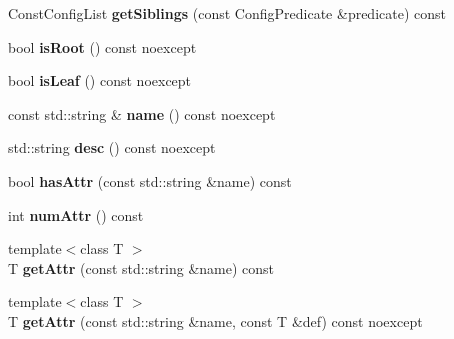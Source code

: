 \begin{DoxyCompactItemize}
\item 
\mbox{\label{classtheoria_1_1config_1_1Config_abb60532c082c92c628ae49ed3b2e9457}} 
Const\+Config\+List {\bfseries get\+Siblings} (const Config\+Predicate \&predicate) const
\item 
\mbox{\label{classtheoria_1_1config_1_1Config_ad50b474daddfbec84d7e610f7687fb04}} 
bool {\bfseries is\+Root} () const noexcept
\item 
\mbox{\label{classtheoria_1_1config_1_1Config_ad5c77fb1f86a7df2dce21972f921da33}} 
bool {\bfseries is\+Leaf} () const noexcept
\item 
\mbox{\label{classtheoria_1_1config_1_1Config_af4929f1c9b86576fdc439051a10f89cd}} 
const std\+::string \& {\bfseries name} () const noexcept
\item 
\mbox{\label{classtheoria_1_1config_1_1Config_a4d6b2e26d1139819769eaf6bb959b034}} 
std\+::string {\bfseries desc} () const noexcept
\item 
\mbox{\label{classtheoria_1_1config_1_1Config_a01d4128f1f86ad2ff01dfeb3c52c72f4}} 
bool {\bfseries has\+Attr} (const std\+::string \&name) const
\item 
\mbox{\label{classtheoria_1_1config_1_1Config_a733766f29f0b75b7bf1224971968d52c}} 
int {\bfseries num\+Attr} () const
\item 
\mbox{\label{classtheoria_1_1config_1_1Config_a0170adaf1d64ada4eafb43758e520837}} 
{\footnotesize template$<$class T $>$ }\\T {\bfseries get\+Attr} (const std\+::string \&name) const
\item 
\mbox{\label{classtheoria_1_1config_1_1Config_ad05bba9dcd7dc78b999f2825fd99f8e0}} 
{\footnotesize template$<$class T $>$ }\\T {\bfseries get\+Attr} (const std\+::string \&name, const T \&def) const noexcept
\item 

\end{DoxyCompactItemize}
